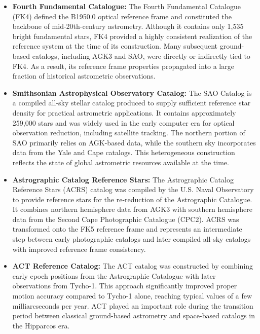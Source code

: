 \documentclass{aastex701}
\begin{document}
\begin{itemize}
    \item \textbf{Fourth Fundamental Catalogue:} \label{subsubsec:fk4} The Fourth Fundamental Catalogue (FK4) defined the B1950.0 optical reference frame and constituted the backbone of mid-20th-century astrometry. Although it contains only 1,535 bright fundamental stars, FK4 provided a highly consistent realization of the reference system at the time of its construction. Many subsequent ground-based catalogs, including AGK3 and SAO, were directly or indirectly tied to FK4. As a result, its reference frame properties propagated into a large fraction of historical astrometric observations.

    \item \textbf{Smithsonian Astrophysical Observatory Catalog:} \label{subsubsec:sao} The SAO Catalog is a compiled all-sky stellar catalog produced to supply sufficient reference star density for practical astrometric applications. It contains approximately 259,000 stars and was widely used in the early computer era for optical observation reduction, including satellite tracking. The northern portion of SAO primarily relies on AGK-based data, while the southern sky incorporates data from the Yale and Cape catalogs. This heterogeneous construction reflects the state of global astrometric resources available at the time.

    \item \textbf{Astrographic Catalog Reference Stars:} \label{subsubsec:acrs} The Astrographic Catalog Reference Stars (ACRS) catalog was compiled by the U.S. Naval Observatory to provide reference stars for the re-reduction of the Astrographic Catalogue. It combines northern hemisphere data from AGK3 with southern hemisphere data from the Second Cape Photographic Catalogue (CPC2). ACRS was transformed onto the FK5 reference frame and represents an intermediate step between early photographic catalogs and later compiled all-sky catalogs with improved reference frame consistency.

    \item \textbf{ACT Reference Catalog:} \label{subsubsec:act} The ACT catalog was constructed by combining early epoch positions from the Astrographic Catalogue with later observations from Tycho-1. This approach significantly improved proper motion accuracy compared to Tycho-1 alone, reaching typical values of a few milliarcseconds per year. ACT played an important role during the transition period between classical ground-based astrometry and space-based catalogs in the Hipparcos era.


\end{itemize}
\end{document}
